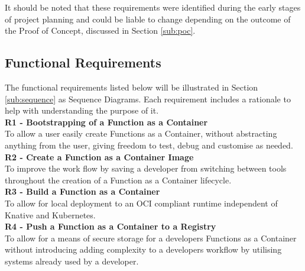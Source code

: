 It should be noted that these requirements were identified during the early stages of project planning and could be liable to change depending on the outcome of the Proof of Concept, discussed in Section \ref{sub:poc}.

\subsection{Functional Requirements}
The functional requirements listed below will be illustrated in Section \ref{sub:sequence} as Sequence Diagrams. Each requirement includes a rationale to help with understanding the purpose of it.
\newline
\\\textbf{R1 - Bootstrapping of a Function as a Container}
\label{req:r1}
\\ To allow a user easily create Functions as a Container, without abstracting anything from the user, giving freedom to test, debug and customise as needed.
\newline
\\\textbf{R2 - Create a Function as a Container Image}
\label{sub:r2}
\\ To improve the work flow by saving a developer from switching between tools throughout the creation of a Function as a Container lifecycle.
\newline
\\\textbf{R3 - Build a Function as a Container}
\label{req:r3}
\\ To allow for local deployment to an OCI compliant runtime independent of Knative and Kubernetes.
\newline
\\\textbf{R4 - Push a Function as a Container to a Registry}
\label{req:r4}
\\ To allow for a means of secure storage for a developers Functions as a Container without introducing adding complexity to a developers workflow by utilising systems already used by a developer.
\newline

